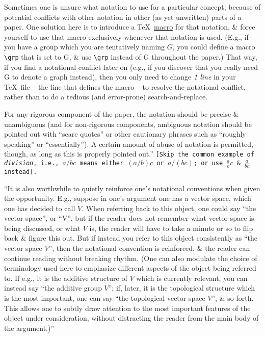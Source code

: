 \documentclass[oneside]{book}
\numberwithin{equation}{section}
\begin{document}
Sometimes one is unsure what notation to use for a particular concept, because of potential conflicts with other notation in other (as yet unwritten) parts of a paper. One solution here is to introduce a \TeX\ \href{http://en.wikipedia.org/wiki/Macro}{macro} for that notation, \& force yourself to use that macro exclusively whenever that notation is used. (E.g., if you have a group which you are tentatively naming $G$, you could define a macro \verb|\grp| that is set to G, \& use \verb|\grp| instead of G throughout the paper.) That way, if you find a notational conflict later on (e.g., if you discover that you really need G to denote a graph instead), then you only need to change \textit{1 line} in your \TeX\ file -- the line that defines the macro -- to resolve the notational conflict, rather than to do a tedious (and error-prone) search-and-replace.

For any rigorous component of the paper, the notation should be precise \& unambiguous (and for non-rigorous components, ambiguous notation should be pointed out with ``scare quotes'' or other cautionary phrases such as ``roughly speaking'' or ``essentially''). A certain amount of abuse of notation is permitted, though, as long as this is properly pointed out.'' \texttt{[Skip the common example of \textit{division}, i.e., $a/bc$ means either $(a/b)c$  or $a/(bc)$; or use $\frac{a}{b}c$ \& $\frac{a}{bc}$ instead].}

``It is also worthwhile to quietly reinforce one's notational conventions when given the opportunity. E.g., suppose in one's argument one has a vector space, which one has decided to call $V$. When referring back to this object, one could say ``the vector space'', or ``V'', but if the reader does not remember what vector space is being discussed, or what $V$ is, the reader will have to take a minute or so to flip back \& figure this out. But if instead you refer to this object consistently as ``the vector space $V$'', then the notational convention is reinforced, \& the reader can continue reading without breaking rhythm. (One can also modulate the choice of terminology used here to emphasize different aspects of the object being referred to. If e.g., it is the additive structure of $V$ which is currently relevant, you can instead say ``the additive group $V$''; if, later, it is the topological structure which is the most important, one can say ``the topological vector space $V$'', \& so forth. This allows one to subtly draw attention to the most important features of the object under consideration, without distracting the reader from the main body of the argument.)''
\end{document}

